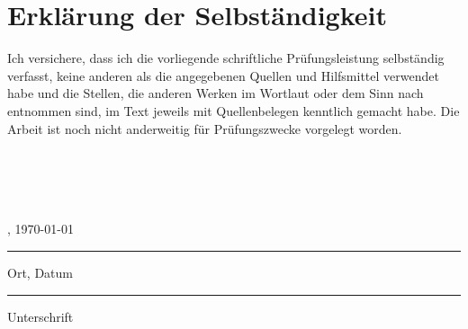 \section*{Erklärung der Selbständigkeit}
Ich versichere, dass ich die vorliegende schriftliche Prüfungsleistung selbständig verfasst, keine anderen als die angegebenen Quellen und Hilfsmittel verwendet habe und die Stellen, die anderen Werken im Wortlaut oder dem Sinn nach entnommen sind, im Text jeweils mit Quellenbelegen kenntlich gemacht habe. Die Arbeit ist noch nicht anderweitig für Prüfungszwecke vorgelegt worden.
\\
\\
\\
\\
\\

\parbox{5cm}{\centering  \ortderarbeit, \today\hrule\strut\centering\footnotesize Ort, Datum}
\hfill
\vspace{-2cm}
\parbox{6cm}{ \hrule\strut \centering\footnotesize Unterschrift}
